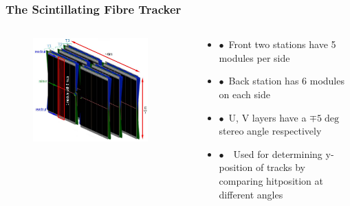 \documentclass[aspectratio=1610, 12pt, xcolor=dvipsnames]{beamer}
\begin{document}
\begin{frame}\frametitle{The Scintillating Fibre Tracker}
  \begin{columns}
    \begin{column}[c]{0.48\textwidth}
      \begin{figure}
        \includegraphics[width=0.9\textwidth]{logos/scifi.png}
      \end{figure}
    \end{column}
    \begin{column}{0.48\textwidth}
      \begin{itemize}
        \item $\bullet$\, Front two stations have 5 modules per side
        \item $\bullet$\, Back station has 6 modules on each side
        \item $\bullet$\, U, V layers have a $\mp 5 \deg$ stereo angle respectively
        \item $\bullet$\, \to\, Used for determining y-position of tracks by comparing hitposition at different angles
      \end{itemize}
    \end{column}
  \end{columns}
\end{frame}
\end{document}
